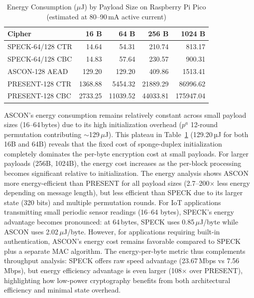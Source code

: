 \documentclass[12pt]{report}
\begin{document}
\begin{table}[H]
    \centering
    \begin{tabular}{lrrrr}
        \toprule
        \textbf{Cipher} & \textbf{16 B} & \textbf{64 B} & \textbf{256 B} & \textbf{1024 B} \\
        \midrule
        SPECK-64/128 CTR & 14.64 & 54.31 & 210.74 & 813.17 \\
        SPECK-64/128 CBC & 14.83 & 57.64 & 230.57 & 900.31 \\
        ASCON-128 AEAD & 129.20 & 129.20 & 409.86 & 1513.41 \\
        PRESENT-128 CTR & 1368.88 & 5454.32 & 21889.29 & 86996.62 \\
        PRESENT-128 CBC & 2733.25 & 11039.52 & 44033.81 & 175947.04 \\
        \bottomrule
    \end{tabular}
    \caption{Energy Consumption ($\mu$J) by Payload Size on Raspberry Pi Pico (estimated at 80--90\,mA active current)}
    \label{tab:energy-comparison}
\end{table}

ASCON's energy consumption remains relatively constant across small payload sizes (16--64\,bytes) due to its high initialization overhead
($p^a$ 12-round permutation contributing $\sim$129\,$\mu$J). This plateau in Table~\ref{tab:energy-comparison} (129.20\,µJ for both 16B and 64B) reveals that the fixed cost of sponge-duplex
initialization completely dominates the per-byte encryption cost at small payloads. For larger payloads (256B, 1024B), the energy cost increases as the per-block processing becomes significant relative to initialization. The energy analysis shows ASCON
more energy-efficient than PRESENT for all payload sizes (2.7--200$\times$ less energy depending on message length),
but less efficient than SPECK due to its larger state (320 bits) and multiple permutation rounds. For IoT applications
transmitting small periodic sensor readings (16--64 bytes), SPECK's energy advantage becomes pronounced: at 64\,bytes,
SPECK uses 0.85\,$\mu$J/byte while ASCON uses 2.02\,$\mu$J/byte. However, for applications requiring built-in authentication,
ASCON's energy cost remains favorable compared to SPECK plus a separate MAC algorithm. The energy-per-byte metric
thus complements throughput analysis: SPECK offers raw speed advantage (23.67\,Mbps vs 7.56\,Mbps), but energy
efficiency advantage is even larger (108$\times$ over PRESENT), highlighting how low-power cryptography benefits from
both architectural efficiency and minimal state overhead.
\end{document}
